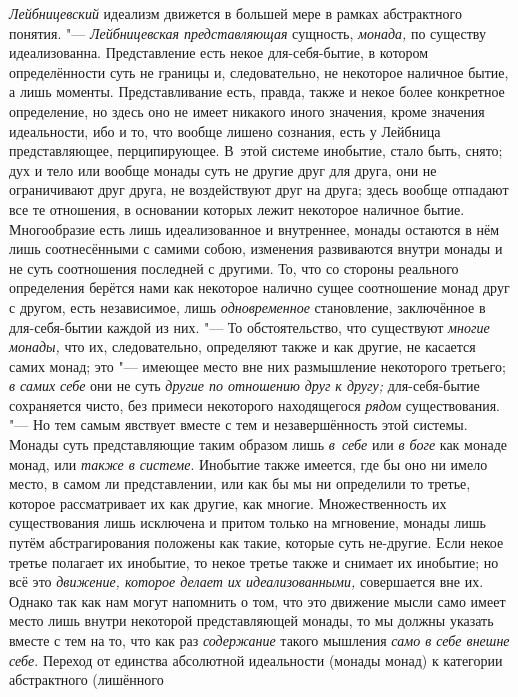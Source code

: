 {\em Лейбницевский} идеализм движется в большей мере в
рамках абстрактного понятия. "--- {\em Лейбницевская
представляющая} сущность, {\em монада,} по существу
идеализованна. Представление есть некое для-себя-бытие, в котором
определённости суть не границы и, следовательно, не некоторое наличное
бытие, а лишь моменты. Представливание есть, правда, также и некое более
конкретное определение, но здесь оно не имеет никакого иного значения,
кроме значения идеальности, ибо и то, что вообще лишено сознания, есть у
Лейбница представляющее, перципирующее. В~этой системе инобытие, стало
быть, снято; дух и тело или вообще монады суть не другие друг для друга,
они не ограничивают друг друга, не воздействуют друг на друга; здесь вообще
отпадают все те отношения, в основании которых лежит некоторое наличное
бытие. Многообразие есть лишь идеализованное и внутреннее, монады остаются
в нём лишь соотнесёнными с самими собою, изменения развиваются внутри
монады и не суть соотношения последней с другими. То, что со стороны
реального определения берётся нами как некоторое налично сущее соотношение
монад друг с другом, есть независимое, лишь
{\em одновременное} становление, заключённое в
для-себя-бытии каждой из них. "--- То обстоятельство, что существуют
{\em многие монады,} что их, следовательно, определяют
также и как другие, не касается самих монад; это "--- имеющее место вне них
размышление некоторого третьего; {\em в самих себе} они
не суть {\em другие по отношению друг к другу;}
для-себя-бытие сохраняется чисто, без примеси некоторого находящегося
{\em рядом} существования. "--- Но тем самым явствует
вместе с тем и незавершённость этой системы. Монады суть представляющие
таким образом лишь {\em в~себе} или {\em в боге} как монаде монад, или
{\em также в системе}. Инобытие также имеется, где бы
оно ни имело место, в самом ли представлении, или как бы мы ни определили
то третье, которое рассматривает их как другие, как многие. Множественность
их существования лишь исключена и притом только на мгновение, монады лишь
путём абстрагирования положены как такие, которые суть не-другие. Если
некое третье полагает их инобытие, то некое третье также и снимает их
инобытие; но всё это {\em движение, которое делает их
идеализованными,} совершается вне их. Однако так как нам могут напомнить о
том, что это движение мысли само имеет место лишь внутри некоторой
представляющей монады, то мы должны указать вместе с тем на то, что как раз
{\em содержание} такого мышления
{\em само в себе внешне себе}. Переход от единства
абсолютной идеальности (монады монад) к категории абстрактного (лишённого
